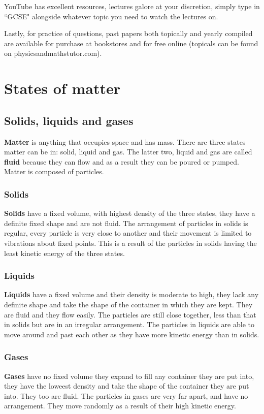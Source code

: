 \documentclass{article}
\begin{document}
YouTube has excellent resources, lectures galore
at your discretion, simply type in ``GCSE" alongside whatever topic you need to watch
the lectures on.

Lastly, for practice of questions, past papers both topically and yearly compiled are
available for purchase at bookstores and for free online (topicals can be found on
physicsandmathstutor.com).
\tableofcontents \newpage

\section{States of matter}
\subsection{Solids, liquids and gases}
\textbf{Matter} is anything that occupies space and has mass. There are three states matter can
be in: solid, liquid and gas. The latter two, liquid and gas are called \textbf{fluid} 
because they can flow and as a result they can be poured or pumped.
Matter is composed of particles.

\subsubsection*{Solids}
\textbf{Solids} have a fixed volume, with highest density of the three states, they have 
a definite fixed shape and are not fluid. The arrangement of particles in solids is regular,
every particle is very close to another and their movement is limited to vibrations about
fixed points. This is a result of the particles in solids having the least kinetic energy of
the three states.

\subsubsection*{Liquids}
\textbf{Liquids} have a fixed volume and their density is moderate to high, they lack any 
definite shape and take the shape of the container in which they are kept. They are fluid and
they flow easily. The particles are still close together, less than that in solids but are
in an irregular arrangement. The particles in liquids are able to move around and past each 
other as they have more kinetic energy than in solids.

\subsubsection*{Gases}
\textbf{Gases} have no fixed volume they expand to fill any container they are put into, they
have the loweest density and take the shape of the container they are put into. They too are
fluid. The particles in gases are very far apart, and have no arrangement. They move randomly
as a result of their high kinetic energy.
\end{document}
